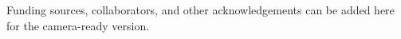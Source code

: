 Funding sources, collaborators, and other acknowledgements can be added here
for the camera-ready version.
